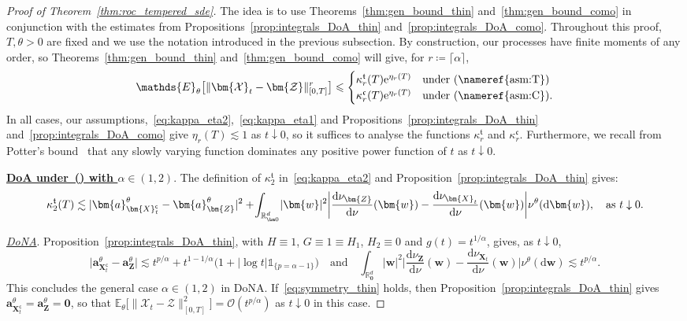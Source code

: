 \documentclass[en,oneside,bbfont,article]{amsart}
\theoremstyle{remark}
\theoremstyle{definition}
\theoremstyle{definition}
\newcommand\X{\bm{\mathcal{X}}}
\newcommand\ZZ{\bm{\mathcal{Z}}}
\newcommand\R{\mathbb{R}}
\newcommand\E{\mathds{E}}
\newcommand\e{\mathord{\mathrm{e}}}
\newcommand\1{\mathds{1}}
\newcommand\Oh{\mathcal{O}}
\newcommand\da{\downarrow}
\renewcommand\le{\leqslant}
\newcommand\co{\mathsf{c}}
\newcommand{\D}{\mathrm{d}}
\newcommand{\mft}{{\mathfrak{t}}}
\newcommand{\mfc}{{\mathfrak{c}}}
\newcommand{\mfK}{{\mathfrak{K}}}
\begin{document}
\begin{proof}[Proof of Theorem~\ref{thm:roc_tempered_sde}] 
The idea is to use Theorems~\ref{thm:gen_bound_thin} and~\ref{thm:gen_bound_como} in conjunction with the estimates from Propositions~\ref{prop:integrals_DoA_thin} and~\ref{prop:integrals_DoA_como}. Throughout this proof, $T,\theta>0$ are fixed and we use the notation introduced in the previous subsection. %
By construction, our processes have finite moments of any order, so Theorems~\ref{thm:gen_bound_thin} and~\ref{thm:gen_bound_como} will give, for $r\coloneqq\lceil\alpha\rceil$,
\[
\E_\theta\big[\|\X_t-\ZZ\|_{[0,T]}^r\big] 
\le 
\begin{cases}
\kappa_r^\mft(T)\e^{\eta_r(T)}
&\text{under (\nameref{asm:T})}\\
\kappa_r^\mfc(T)\e^{\eta_r(T)}
&\text{under (\nameref{asm:C}).}
\end{cases}
\]
In all cases, our assumptions,~\eqref{eq:kappa_eta2},~\eqref{eq:kappa_eta1} and Propositions~\ref{prop:integrals_DoA_thin} and~\ref{prop:integrals_DoA_como} give $\eta_r(T)\lesssim 1$ as $t\da 0$, so it suffices to analyse the functions $\kappa_r^\mft$ and $\kappa_r^\mfc$. Furthermore, we recall from Potter's bound~\cite[Thm~1.5.6]{MR1015093} that any slowly varying function dominates any positive power function of $t$ as $t\da 0$.

\underline{\textbf{DoA under~() with $\alpha \in (1,2)$}}. The definition of $\kappa_2^\mft$ in~\eqref{eq:kappa_eta2} and Proposition~\ref{prop:integrals_DoA_thin} gives:
\[
\kappa_2^\mft(T)
\lesssim |\bm{a}_{\bm{X}_t^\co}^\theta-\bm{a}_{\bm{Z}}^\theta|^2 
+\!\int_{\R^d_{\bm0}}\!|\bm{w}|^2\bigg|\frac{\D\nu_{\bm{Z}}}{\D\nu}(\bm{w})
    -\frac{\D\nu_{\bm{X}_t}}{\D\nu}(\bm{w})\bigg| \nu^\theta(\D\bm{w}),\\ 
\quad\text{as }t\da 0.
\]

{\underline{\textit{DoNA}}}. Proposition~\ref{prop:integrals_DoA_thin}, with $H\equiv 1$, $G\equiv 1\equiv H_1$, $H_2\equiv 0$ and $g(t)=t^{1/\alpha}$, gives, as $t\da 0$,
\begin{equation*}
\big|\bm{a}_{\bm{X}^\co_t}^\theta-\bm{a}_{\bm{Z}}^\theta\big|
\lesssim t^{p/\alpha} 
+ t^{1-1/\alpha}\big(1
    +|\log t|\1_{\{p=\alpha-1\}}\big)
\quad\text{and}\quad
\int_{\R^d_{\bm 0}} |\bm{w}|^2\bigg|\frac{\D\nu_{\bm{Z}}}{\D\nu}(\bm{w})
    -\frac{\D\nu_{\bm{X}_t}}{\D\nu}(\bm{w})\bigg| \nu^\theta(\D\bm{w})
\lesssim t^{p/\alpha}.
\end{equation*} 
This concludes the general case $\alpha \in (1,2)$ in DoNA. If~\eqref{eq:symmetry_thin} holds, then Proposition~\ref{prop:integrals_DoA_thin} gives $\bm{a}_{\bm{X}^\co_t}^\theta=\bm{a}_{\bm{Z}}^\theta=\bm{0}$, so that $\E_\theta\big[\|\X_t-\ZZ\|_{[0,T]}^2\big] = \Oh(t^{p/\alpha})$ as $t \da 0$ in this case. 


\end{proof}
\end{document}
